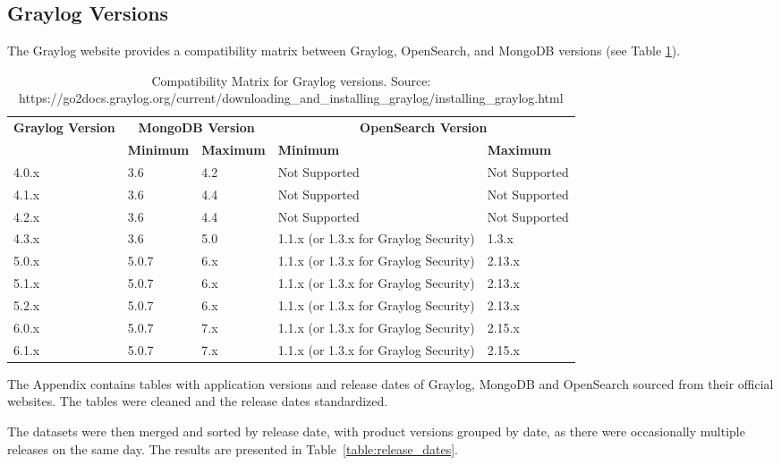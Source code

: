 \documentclass[../main.tex]{subfiles}
\begin{document}
\subsection{Graylog Versions}

The Graylog website provides a compatibility matrix between Graylog, OpenSearch, and MongoDB versions (see Table \ref{table:graylog_compatibility_matrix}). 

\begin{table}[h]
\centering
\begin{tabular}{|l|l|l|l|l|}
\hline
\textbf{Graylog Version} & \multicolumn{2}{c|}{\textbf{MongoDB Version}} & \multicolumn{2}{c|}{\textbf{OpenSearch Version}} \\ \cline{2-5}
 & \textbf{Minimum} & \textbf{Maximum} & \textbf{Minimum} & \textbf{Maximum} \\ \hline
4.0.x & 3.6 & 4.2 & Not Supported & Not Supported \\ \hline
4.1.x & 3.6 & 4.4 & Not Supported & Not Supported \\ \hline
4.2.x & 3.6 & 4.4 & Not Supported & Not Supported \\ \hline
4.3.x & 3.6 & 5.0 & 1.1.x (or 1.3.x for Graylog Security) & 1.3.x \\ \hline
5.0.x & 5.0.7 & 6.x & 1.1.x (or 1.3.x for Graylog Security) & 2.13.x \\ \hline
5.1.x & 5.0.7 & 6.x & 1.1.x (or 1.3.x for Graylog Security) & 2.13.x \\ \hline
5.2.x & 5.0.7 & 6.x & 1.1.x (or 1.3.x for Graylog Security) & 2.13.x \\ \hline
6.0.x & 5.0.7 & 7.x & 1.1.x (or 1.3.x for Graylog Security) & 2.15.x \\ \hline
6.1.x & 5.0.7 & 7.x & 1.1.x (or 1.3.x for Graylog Security) & 2.15.x \\ \hline
\end{tabular}
\caption{Compatibility Matrix for Graylog versions. Source: https://go2docs.graylog.org/current/downloading\_and\_installing\_graylog/installing\_graylog.html}
\label{table:graylog_compatibility_matrix}
\end{table}

The Appendix contains tables with application versions and release dates of Graylog, MongoDB and OpenSearch sourced from their official websites. The tables were cleaned and the release dates standardized.

The datasets were then merged and sorted by release date, with product versions grouped by date, as there were occasionally multiple releases on the same day. The results are presented in Table~\ref{table:release_dates}.
\end{document}
